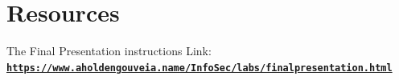 \documentclass[12pt]{article}
\begin{document}
\section*{Resources}
The Final Presentation instructions
Link: \href{https://www.aholdengouveia.name/InfoSec/labs/finalpresentation.html}{\textbf{\nolinkurl{https://www.aholdengouveia.name/InfoSec/labs/finalpresentation.html}}}
\end{document}
